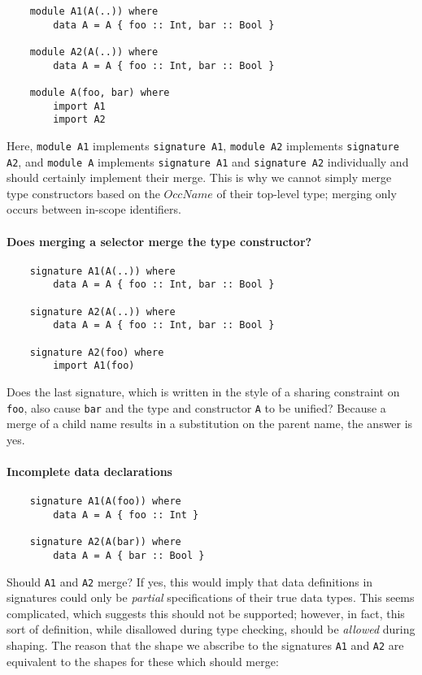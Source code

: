 \documentclass{article}
\newcommand{\I}[1]{\ensuremath{\mathit{#1}}}
\begin{document}
\begin{verbatim}
    module A1(A(..)) where
        data A = A { foo :: Int, bar :: Bool }

    module A2(A(..)) where
        data A = A { foo :: Int, bar :: Bool }

    module A(foo, bar) where
        import A1
        import A2
\end{verbatim}

Here, \verb|module A1| implements \verb|signature A1|, \verb|module A2| implements \verb|signature A2|,
and \verb|module A| implements \verb|signature A1| and \verb|signature A2| individually
and should certainly implement their merge.  This is why we cannot simply
merge type constructors based on the \I{OccName} of their top-level type;
merging only occurs between in-scope identifiers.

\paragraph{Does merging a selector merge the type constructor?}

\begin{verbatim}
    signature A1(A(..)) where
        data A = A { foo :: Int, bar :: Bool }

    signature A2(A(..)) where
        data A = A { foo :: Int, bar :: Bool }

    signature A2(foo) where
        import A1(foo)
\end{verbatim}
%
Does the last signature, which is written in the style of a sharing constraint on \verb|foo|,
also cause \verb|bar| and the type and constructor \verb|A| to be unified?
Because a merge of a child name results in a substitution on the parent name,
the answer is yes.

\paragraph{Incomplete data declarations}

\begin{verbatim}
    signature A1(A(foo)) where
        data A = A { foo :: Int }

    signature A2(A(bar)) where
        data A = A { bar :: Bool }
\end{verbatim}
%
Should \verb|A1| and \verb|A2| merge?  If yes, this would imply
that data definitions in signatures could only be \emph{partial}
specifications of their true data types.  This seems complicated,
which suggests this should not be supported; however, in fact,
this sort of definition, while disallowed during type checking,
should be \emph{allowed} during shaping. The reason that the
shape we abscribe to the signatures \verb|A1| and \verb|A2| are
equivalent to the shapes for these which should merge:
\end{document}
